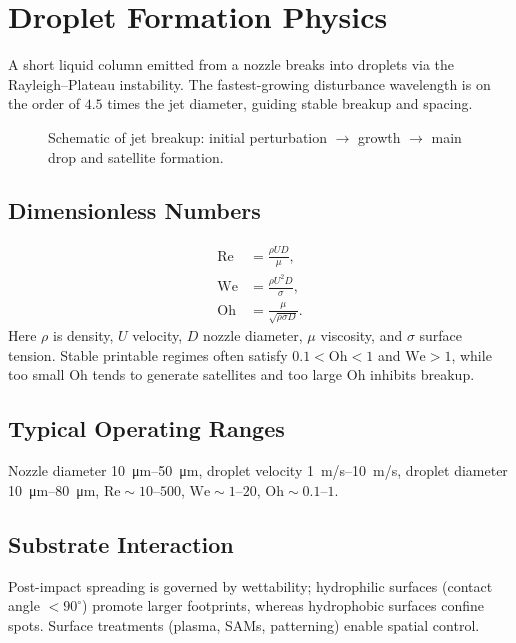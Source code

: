 \documentclass[conference]{IEEEtran}
\newcommand{\Oh}{\mathrm{Oh}}
\newcommand{\We}{\mathrm{We}}
\newcommand{\Rey}{\mathrm{Re}}
\begin{document}
\section{Droplet Formation Physics}
A short liquid column emitted from a nozzle breaks into droplets via the Rayleigh--Plateau instability. The fastest-growing disturbance wavelength is on the order of $4.5$ times the jet diameter, guiding stable breakup and spacing.

\begin{figure}[!t]
  \centering
  
  \caption{Schematic of jet breakup: initial perturbation $\rightarrow$ growth $\rightarrow$ main drop and satellite formation.}
  \label{fig:droplet_instability}
\end{figure}

\subsection{Dimensionless Numbers}
\begin{align}
\Rey &= \frac{\rho U D}{\mu}, \\
\We  &= \frac{\rho U^2 D}{\sigma}, \\
\Oh  &= \frac{\mu}{\sqrt{\rho \sigma D}} .
\end{align}
Here $\rho$ is density, $U$ velocity, $D$ nozzle diameter, $\mu$ viscosity, and $\sigma$ surface tension.
Stable printable regimes often satisfy $0.1<\Oh<1$ and $\We>1$, while too small $\Oh$ tends to generate satellites and too large $\Oh$ inhibits breakup.

\subsection{Typical Operating Ranges}
Nozzle diameter \SIrange{10}{50}{\micro\meter}, droplet velocity \SIrange{1}{10}{m/s}, droplet diameter \SIrange{10}{80}{\micro\meter}, $\Rey\sim10$--$500$, $\We\sim1$--$20$, $\Oh\sim0.1$--$1$.

\subsection{Substrate Interaction}
Post-impact spreading is governed by wettability; hydrophilic surfaces (contact angle $<90^\circ$) promote larger footprints, whereas hydrophobic surfaces confine spots. Surface treatments (plasma, SAMs, patterning) enable spatial control.
\end{document}
